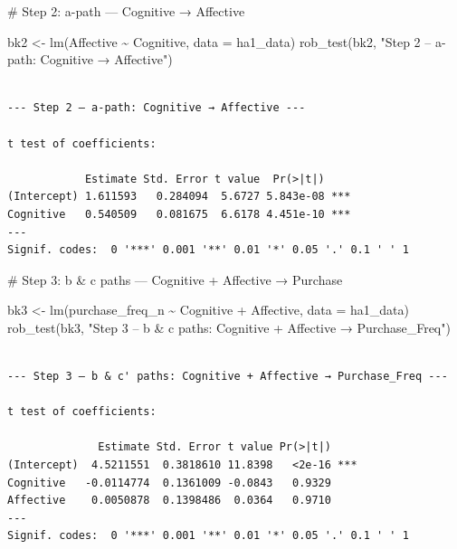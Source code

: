 \documentclass[
  letterpaper,
  DIV=11,
  numbers=noendperiod]{scrartcl}
\newenvironment{Shaded}{\begin{snugshade}}{\end{snugshade}}
\newcommand{\AttributeTok}[1]{\textcolor[rgb]{0.40,0.45,0.13}{#1}}
\newcommand{\CommentTok}[1]{\textcolor[rgb]{0.37,0.37,0.37}{#1}}
\newcommand{\FunctionTok}[1]{\textcolor[rgb]{0.28,0.35,0.67}{#1}}
\newcommand{\NormalTok}[1]{\textcolor[rgb]{0.00,0.23,0.31}{#1}}
\newcommand{\OtherTok}[1]{\textcolor[rgb]{0.00,0.23,0.31}{#1}}
\newcommand{\SpecialCharTok}[1]{\textcolor[rgb]{0.37,0.37,0.37}{#1}}
\newcommand{\StringTok}[1]{\textcolor[rgb]{0.13,0.47,0.30}{#1}}
\begin{document}
\begin{Shaded}
\begin{Highlighting}[]
\CommentTok{\# Step 2: a{-}path — Cognitive → Affective}

\NormalTok{bk2 }\OtherTok{\textless{}{-}} \FunctionTok{lm}\NormalTok{(Affective }\SpecialCharTok{\textasciitilde{}}\NormalTok{ Cognitive, }\AttributeTok{data =}\NormalTok{ ha1\_data)}
\FunctionTok{rob\_test}\NormalTok{(bk2, }\StringTok{"Step 2 – a{-}path: Cognitive → Affective"}\NormalTok{)}
\end{Highlighting}
\end{Shaded}

\begin{verbatim}

--- Step 2 – a-path: Cognitive → Affective ---

t test of coefficients:

            Estimate Std. Error t value  Pr(>|t|)    
(Intercept) 1.611593   0.284094  5.6727 5.843e-08 ***
Cognitive   0.540509   0.081675  6.6178 4.451e-10 ***
---
Signif. codes:  0 '***' 0.001 '**' 0.01 '*' 0.05 '.' 0.1 ' ' 1
\end{verbatim}

\begin{Shaded}
\begin{Highlighting}[]
\CommentTok{\# Step 3: b \& c\textquotesingle{} paths — Cognitive + Affective → Purchase}

\NormalTok{bk3 }\OtherTok{\textless{}{-}} \FunctionTok{lm}\NormalTok{(purchase\_freq\_n }\SpecialCharTok{\textasciitilde{}}\NormalTok{ Cognitive }\SpecialCharTok{+}\NormalTok{ Affective, }\AttributeTok{data =}\NormalTok{ ha1\_data)}
\FunctionTok{rob\_test}\NormalTok{(bk3, }\StringTok{"Step 3 – b \& c\textquotesingle{} paths: Cognitive + Affective → Purchase\_Freq"}\NormalTok{)}
\end{Highlighting}
\end{Shaded}

\begin{verbatim}

--- Step 3 – b & c' paths: Cognitive + Affective → Purchase_Freq ---

t test of coefficients:

              Estimate Std. Error t value Pr(>|t|)    
(Intercept)  4.5211551  0.3818610 11.8398   <2e-16 ***
Cognitive   -0.0114774  0.1361009 -0.0843   0.9329    
Affective    0.0050878  0.1398486  0.0364   0.9710    
---
Signif. codes:  0 '***' 0.001 '**' 0.01 '*' 0.05 '.' 0.1 ' ' 1
\end{verbatim}
\end{document}
